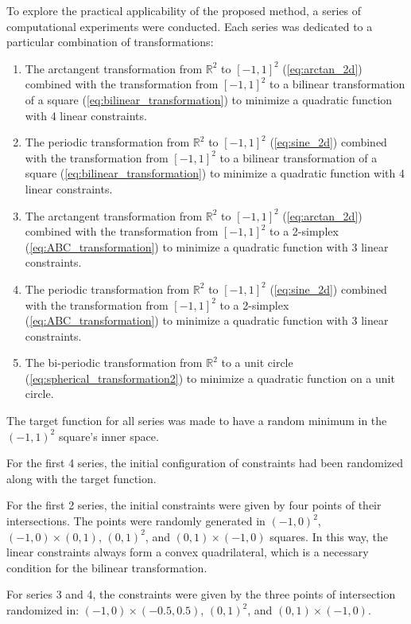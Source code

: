 \documentclass[
	a4paper, %
	10pt, %
	unnumberedsections, %
	twoside, %
]{LTJournalArticle}
\begin{document}
To explore the practical applicability of the proposed method, a series of computational experiments were conducted. Each series was dedicated to a particular combination of transformations:
\begin{enumerate}
  \item The arctangent transformation from $\mathbb{R}^2$ to $[-1, 1]^2$ (\ref{eq:arctan_2d}) combined with the transformation from $[-1, 1]^2$ to a bilinear transformation of a square (\ref{eq:bilinear_transformation}) to minimize a quadratic function with 4 linear constraints.
  \item The periodic transformation from $\mathbb{R}^2$ to $[-1, 1]^2$ (\ref{eq:sine_2d}) combined with the transformation from $[-1, 1]^2$ to a bilinear transformation of a square (\ref{eq:bilinear_transformation}) to minimize a quadratic function with 4 linear constraints.
  \item The arctangent transformation from $\mathbb{R}^2$ to $[-1, 1]^2$ (\ref{eq:arctan_2d}) combined with the transformation from $[-1, 1]^2$ to a 2-simplex (\ref{eq:ABC_transformation}) to minimize a quadratic function with 3 linear constraints.
  \item The periodic transformation from $\mathbb{R}^2$ to $[-1, 1]^2$ (\ref{eq:sine_2d}) combined with the transformation from $[-1, 1]^2$ to a 2-simplex (\ref{eq:ABC_transformation}) to minimize a quadratic function with 3 linear constraints.
  \item The bi-periodic transformation from $\mathbb{R}^2$ to a unit circle (\ref{eq:spherical_transformation2}) to minimize a quadratic function on a unit circle.
\end{enumerate}

The target function for all series was made to have a random minimum in the $(-1, 1)^2$ square's inner space.

For the first 4 series, the initial configuration of constraints had been randomized along with the target function. 

For the first 2 series, the initial constraints were given by four points of their intersections. The points were randomly generated in $(-1, 0)^2$, $(-1, 0)\times(0, 1)$, $(0, 1)^2$, and $(0, 1)\times(-1, 0)$ squares. In this way, the linear constraints always form a convex quadrilateral, which is a necessary condition for the bilinear transformation.

For series 3 and 4, the constraints were given by the three points of intersection randomized in: $(-1, 0)\times(-0.5, 0.5)$, $(0, 1)^2$, and $(0, 1)\times(-1, 0)$. 
\end{document}
